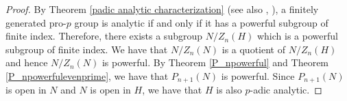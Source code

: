 \documentclass[12pt]{elsarticle}
\newtheorem*{main corollary*}{Main Corollary}
\theoremstyle{definition}
\begin{document}
\begin{proof}
    By Theorem \ref{padic analytic characterization} (see also \cite[III, 3.4.3]{La1965}, \cite[Theorem 2.1]{LM872}), a finitely generated pro-$p$ group is analytic if and only if it has a powerful subgroup of finite index. Therefore, there exists a subgroup $N/Z_n(H)$ which is a powerful subgroup of finite index. We have that $N/Z_n(N)$ is a quotient of $N/Z_n(H)$ and hence $N/Z_n(N)$ is powerful. By Theorem \ref{P_npowerful} and Theorem \ref{P_npowerfulevenprime}, we have that $P_{n+1}(N)$ is powerful. Since $P_{n+1}(N)$ is open in $N$ and $N$ is open in $H$, we have that $H$ is also $p$-adic analytic.
\end{proof}

\end{document}
